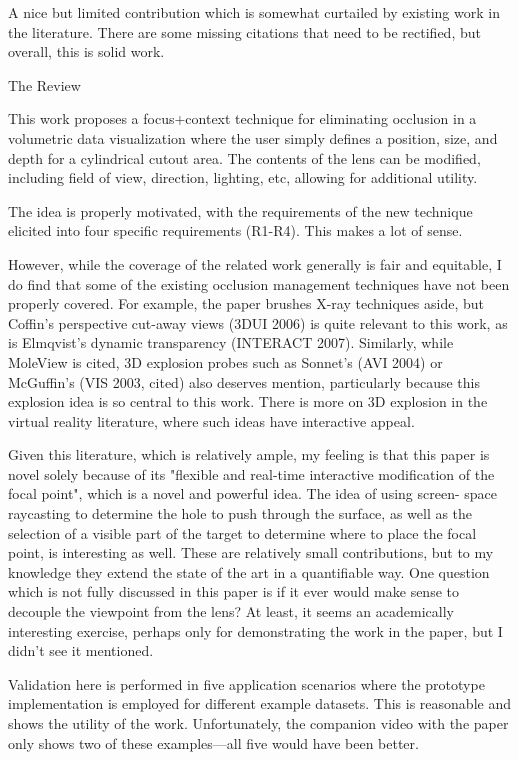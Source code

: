 \documentclass[a4paper,10pt]{article}
\begin{document}
{A nice but limited contribution which is somewhat curtailed by existing work in
    the literature. There are some missing citations that need to be rectified, but
    overall, this is solid work.

  The Review

    This work proposes a focus+context technique for eliminating occlusion in a
    volumetric data visualization where the user simply defines a position, size, and
    depth for a cylindrical cutout area. The contents of the lens can be modified,
    including field of view, direction, lighting, etc, allowing for additional
    utility.

    The idea is properly motivated, with the requirements of the new technique
    elicited into four specific requirements (R1-R4). This makes a lot of sense.

    However, while the coverage of the related work generally is fair and equitable, I
    do find that some of the existing occlusion management techniques have not been
    properly covered. For example, the paper brushes X-ray techniques aside, but
    Coffin's perspective cut-away views (3DUI 2006) is quite relevant to this work, as
    is Elmqvist's dynamic transparency (INTERACT 2007). Similarly, while MoleView is
    cited, 3D explosion probes such as Sonnet's (AVI 2004) or McGuffin's (VIS 2003,
    cited) also deserves mention, particularly because this explosion idea is so
    central to this work. There is more on 3D explosion in the virtual reality
    literature, where such ideas have interactive appeal.

    Given this literature, which is relatively ample, my feeling is that this paper is
    novel solely because of its "flexible and real-time interactive modification of
    the focal point", which is a novel and powerful idea. The idea of using screen-
    space raycasting to determine the hole to push through the surface, as well as the
    selection of a visible part of the target to determine where to place the focal
    point, is interesting as well. These are relatively small contributions, but to my
    knowledge they extend the state of the art in a quantifiable way. One question
    which is not fully discussed in this paper is if it ever would make sense to
    decouple the viewpoint from the lens? At least, it seems an academically
    interesting exercise, perhaps only for demonstrating the work in the paper, but I
    didn't see it mentioned.

    Validation here is performed in five application scenarios where the prototype
    implementation is employed for different example datasets. This is reasonable and
    shows the utility of the work. Unfortunately, the companion video with the paper
    only shows two of these examples---all five would have been better.

}
\end{document}
